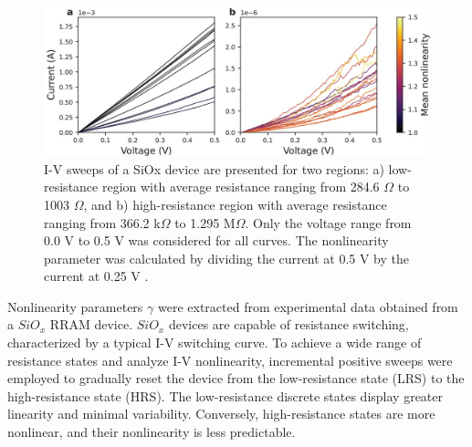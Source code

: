 \begin{figure}[htbp!] 
\centering    
\includegraphics[width=1\textwidth]{Chapter6/Figs/h.png}
\caption[I-V sweeps of a SiOx device are presented for two regions]{I-V sweeps of a SiOx device are presented for two regions: a) low-resistance region with average resistance ranging from 284.6 $\Omega$ to 1003 $\Omega$, and b) high-resistance region with average resistance ranging from 366.2 k$\Omega$ to 1.295 M$\Omega$. Only the voltage range from 0.0 V to 0.5 V was considered for all curves. The nonlinearity parameter was calculated by dividing the current at 0.5 V by the current at 0.25 V \cite{joksas2022nonideality}.}
\label{fig:6h}
\end{figure}


\noindent Nonlinearity parameters $\gamma$ were extracted from experimental data obtained from a $SiO_x$  RRAM device. $SiO_x$ devices are capable of resistance switching, characterized by a typical I-V switching curve. To achieve a wide range of resistance states and analyze I-V nonlinearity, incremental positive sweeps were employed to gradually reset the device from the low-resistance state (LRS) to the high-resistance state (HRS). The low-resistance discrete states display greater linearity and minimal variability. Conversely, high-resistance states are more nonlinear, and their nonlinearity is less predictable.\\

